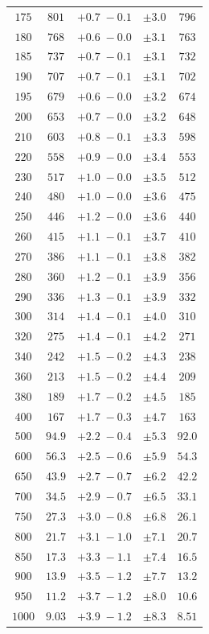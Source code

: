 \begin{table}
\begin{tabular}{ccccc}
$175 $&$  801 $&$ +0.7 \; -\!0.1 $&$ \pm 3.0 $&$ 796   $ \\
$180 $&$  768 $&$ +0.6 \; -\!0.0 $&$ \pm 3.1 $&$ 763   $ \\
$185 $&$  737 $&$ +0.7 \; -\!0.1 $&$ \pm 3.1 $&$ 732   $ \\
$190 $&$  707 $&$ +0.7 \; -\!0.1 $&$ \pm 3.1 $&$ 702   $ \\
$195 $&$  679 $&$ +0.6 \; -\!0.0 $&$ \pm 3.2 $&$ 674   $ \\
$200 $&$  653 $&$ +0.7 \; -\!0.0 $&$ \pm 3.2 $&$ 648   $ \\
$210 $&$  603 $&$ +0.8 \; -\!0.1 $&$ \pm 3.3 $&$ 598   $ \\
$220 $&$  558 $&$ +0.9 \; -\!0.0 $&$ \pm 3.4 $&$ 553   $ \\
$230 $&$  517 $&$ +1.0 \; -\!0.0 $&$ \pm 3.5 $&$ 512   $ \\
$240 $&$  480 $&$ +1.0 \; -\!0.0 $&$ \pm 3.6 $&$ 475   $ \\
$250 $&$  446 $&$ +1.2 \; -\!0.0 $&$ \pm 3.6 $&$ 440   $ \\
$260 $&$  415 $&$ +1.1 \; -\!0.1 $&$ \pm 3.7 $&$ 410   $ \\
$270 $&$  386 $&$ +1.1 \; -\!0.1 $&$ \pm 3.8 $&$ 382   $ \\
$280 $&$  360 $&$ +1.2 \; -\!0.1 $&$ \pm 3.9 $&$ 356   $ \\
$290 $&$  336 $&$ +1.3 \; -\!0.1 $&$ \pm 3.9 $&$ 332   $ \\
$300 $&$  314 $&$ +1.4 \; -\!0.1 $&$ \pm 4.0 $&$ 310   $ \\
$320 $&$  275 $&$ +1.4 \; -\!0.1 $&$ \pm 4.2 $&$ 271   $ \\
$340 $&$  242 $&$ +1.5 \; -\!0.2 $&$ \pm 4.3 $&$ 238   $ \\
$360 $&$  213 $&$ +1.5 \; -\!0.2 $&$ \pm 4.4 $&$ 209   $ \\
$380 $&$  189 $&$ +1.7 \; -\!0.2 $&$ \pm 4.5 $&$ 185   $ \\
$400 $&$  167 $&$ +1.7 \; -\!0.3 $&$ \pm 4.7 $&$ 163   $ \\
$500 $&$ 94.9 $&$ +2.2 \; -\!0.4 $&$ \pm 5.3 $&$ 92.0  $ \\
$600 $&$ 56.3 $&$ +2.5 \; -\!0.6 $&$ \pm 5.9 $&$ 54.3  $ \\
$650 $&$ 43.9 $&$ +2.7 \; -\!0.7 $&$ \pm 6.2 $&$ 42.2  $ \\
$700 $&$ 34.5 $&$ +2.9 \; -\!0.7 $&$ \pm 6.5 $&$ 33.1  $ \\
$750 $&$ 27.3 $&$ +3.0 \; -\!0.8 $&$ \pm 6.8 $&$ 26.1  $ \\
$800 $&$ 21.7 $&$ +3.1 \; -\!1.0 $&$ \pm 7.1 $&$ 20.7  $ \\
$850 $&$ 17.3 $&$ +3.3 \; -\!1.1 $&$ \pm 7.4 $&$ 16.5  $ \\
$900 $&$ 13.9 $&$ +3.5 \; -\!1.2 $&$ \pm 7.7 $&$ 13.2  $ \\
$950 $&$ 11.2 $&$ +3.7 \; -\!1.2 $&$ \pm 8.0 $&$ 10.6  $ \\
$1000$&$ 9.03 $&$ +3.9 \; -\!1.2 $&$ \pm 8.3 $&$ 8.51  $ \\
\hline
\end{tabular}
\label{tab:noEWnoSch7TeV}
\end{table}


